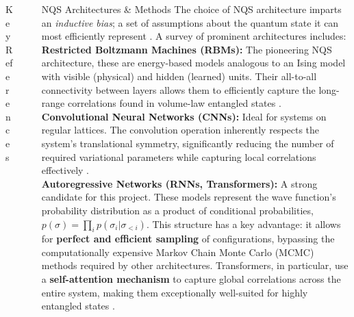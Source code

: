 \documentclass[final]{beamer}
\newlength{\sepwidth}
\newlength{\colwidth}
\newcommand{\separatorcolumn}{\begin{column}{\sepwidth}\end{column}}
\begin{document}
\begin{frame}[t]
\begin{columns}[t]
\begin{column}{\colwidth}
\begin{block}{Key References}
\end{block}
  
\end{column}

\separatorcolumn

\begin{column}{\colwidth}

  \begin{block}{NQS Architectures \& Methods}
    The choice of NQS architecture imparts an \textit{inductive bias}; a set of assumptions about the quantum state it can most efficiently represent \cite{Lange2024Review}. A survey of prominent architectures includes:\\[12px]
    
    \textbf{Restricted Boltzmann Machines (RBMs):} The pioneering NQS architecture, these are energy-based models analogous to an Ising model with visible (physical) and hidden (learned) units. Their all-to-all connectivity between layers allows them to efficiently capture the long-range correlations found in volume-law entangled states \cite{Carleo2017Science, Lange2024Review}.\\[12px]
        
    \textbf{Convolutional Neural Networks (CNNs):} Ideal for systems on regular lattices. The convolution operation inherently respects the system's translational symmetry, significantly reducing the number of required variational parameters while capturing local correlations effectively \cite{Lange2024Review}.\\[12px]
        
    \textbf{Autoregressive Networks (RNNs, Transformers):} A strong candidate for this project. These models represent the wave function's probability distribution as a product of conditional probabilities, $p(\sigma) = \prod_i p(\sigma_i | \sigma_{<i})$. This structure has a key advantage: it allows for \textbf{perfect and efficient sampling} of configurations, bypassing the computationally expensive Markov Chain Monte Carlo (MCMC) methods required by other architectures. Transformers, in particular, use a \textbf{self-attention mechanism} to capture global correlations across the entire system, making them exceptionally well-suited for highly entangled states \cite{Lange2024Review}.
    

\end{block}
\end{column}
\end{columns}
\end{frame}
\end{document}

